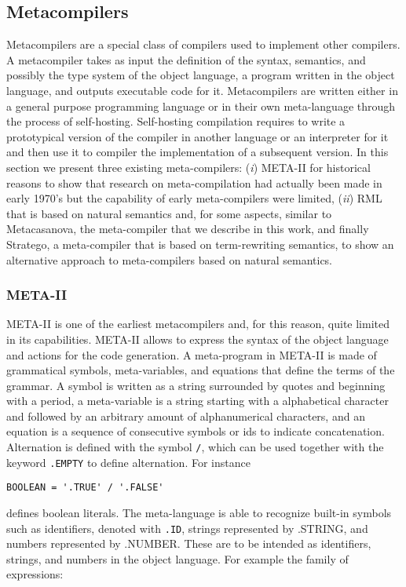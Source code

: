 \subsection{Metacompilers}
Metacompilers are a special class of compilers used to implement other compilers. A metacompiler takes as input the definition of the syntax, semantics, and possibly the type system of the object language, a program written in the object language, and outputs executable code for it. Metacompilers are written either in a general purpose programming language or in their own meta-language through the process of self-hosting. Self-hosting compilation requires to write a prototypical version of the compiler in another language or an interpreter for it and then use it to compiler the implementation of a subsequent version. In this section we present three existing meta-compilers: (\textit{i}) META-II for historical reasons to show that research on meta-compilation had actually been made in early 1970's but the capability of early meta-compilers were limited, (\textit{ii}) RML that is based on natural semantics and, for some aspects, similar to Metacasanova, the meta-compiler that we describe in this work, and finally Stratego, a meta-compiler that is based on term-rewriting semantics, to show an alternative approach to meta-compilers based on natural semantics.

\subsubsection{META-II}
META-II is one of the earliest metacompilers and, for this reason, quite limited in its capabilities. META-II allows to express the syntax of the object language and actions for the code generation. A meta-program in META-II is made of grammatical symbols, meta-variables, and equations that define the terms of the grammar. A symbol is written as a string surrounded by quotes and beginning with a period, a meta-variable is a string starting with a alphabetical character and followed by an arbitrary amount of alphanumerical characters, and an equation is a sequence of consecutive symbols or ids to indicate concatenation. Alternation is defined with the symbol \texttt{/}, which can be used together with the keyword \texttt{.EMPTY} to define alternation. For instance

\begin{lstlisting}
BOOLEAN = '.TRUE' / '.FALSE'
\end{lstlisting}

\noindent
defines boolean literals. The meta-language is able to recognize built-in symbols such as identifiers, denoted with \texttt{.ID}, strings represented by .STRING, and numbers represented by .NUMBER. These are to be intended as identifiers, strings, and numbers in the object language. For example the family of expressions:

